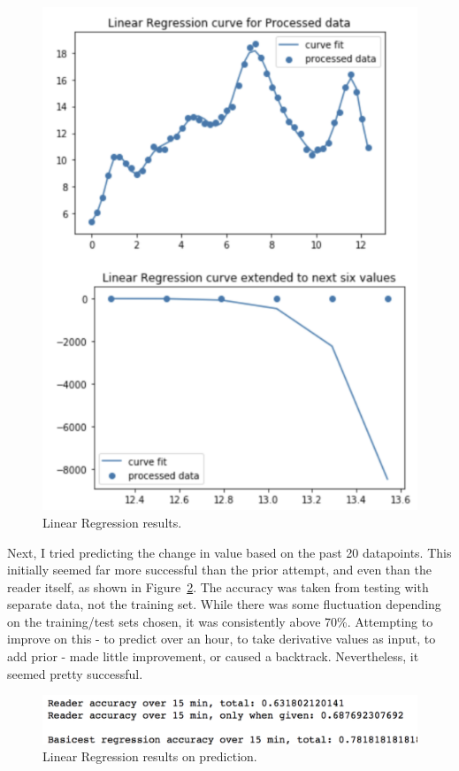 \begin{figure}[ht]
\centering\includegraphics[width=1.0\linewidth]{images/graph6.png}
\caption{Linear Regression results.}
\label{fig:graph6}
\end{figure}

Next, I tried predicting the change in value based on the past 20 datapoints. This initially seemed far more successful than the prior attempt, and even than the reader itself, as shown in Figure~\ref{fig:graph6_5}. The accuracy was taken from testing with separate data, not the training set. While there was some fluctuation depending on the training/test sets chosen, it was consistently above 70\%. Attempting to improve on this - to predict over an hour, to take derivative values as input, to add prior - made little improvement, or caused a backtrack. Nevertheless, it seemed pretty successful.

\begin{figure}[ht]
\centering\includegraphics[width=1.0\linewidth]{images/graph6_5.png}
\caption{Linear Regression results on prediction.}
\label{fig:graph6_5}
\end{figure}


